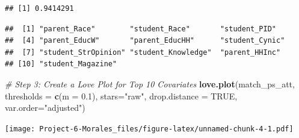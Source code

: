 \documentclass[
]{article}
\newenvironment{Shaded}{\begin{snugshade}}{\end{snugshade}}
\newcommand{\AttributeTok}[1]{\textcolor[rgb]{0.13,0.29,0.53}{#1}}
\newcommand{\CommentTok}[1]{\textcolor[rgb]{0.56,0.35,0.01}{\textit{#1}}}
\newcommand{\ConstantTok}[1]{\textcolor[rgb]{0.56,0.35,0.01}{#1}}
\newcommand{\DecValTok}[1]{\textcolor[rgb]{0.00,0.00,0.81}{#1}}
\newcommand{\FloatTok}[1]{\textcolor[rgb]{0.00,0.00,0.81}{#1}}
\newcommand{\FunctionTok}[1]{\textcolor[rgb]{0.13,0.29,0.53}{\textbf{#1}}}
\newcommand{\NormalTok}[1]{#1}
\newcommand{\OtherTok}[1]{\textcolor[rgb]{0.56,0.35,0.01}{#1}}
\newcommand{\SpecialCharTok}[1]{\textcolor[rgb]{0.81,0.36,0.00}{\textbf{#1}}}
\newcommand{\StringTok}[1]{\textcolor[rgb]{0.31,0.60,0.02}{#1}}
\begin{document}
\begin{verbatim}
## [1] 0.9414291
\end{verbatim}

\begin{Shaded}
\end{Shaded}

\begin{verbatim}
##  [1] "parent_Race"        "student_Race"       "student_PID"       
##  [4] "parent_EducW"       "parent_EducHH"      "student_Cynic"     
##  [7] "student_StrOpinion" "student_Knowledge"  "parent_HHInc"      
## [10] "student_Magazine"
\end{verbatim}

\begin{Shaded}
\begin{Highlighting}[]
\CommentTok{\# Step 3: Create a Love Plot for Top 10 Covariates}
\FunctionTok{love.plot}\NormalTok{(match\_ps\_att, }\AttributeTok{thresholds =} \FunctionTok{c}\NormalTok{(}\AttributeTok{m =} \FloatTok{0.1}\NormalTok{), }\AttributeTok{stars=}\StringTok{"raw"}\NormalTok{, }\AttributeTok{drop.distance =} \ConstantTok{TRUE}\NormalTok{, }\AttributeTok{var.order=}\StringTok{"adjusted"}\NormalTok{)}
\end{Highlighting}
\end{Shaded}

\texttt{[image: Project-6-Morales\_files/figure-latex/unnamed-chunk-4-1.pdf]}
\end{document}
